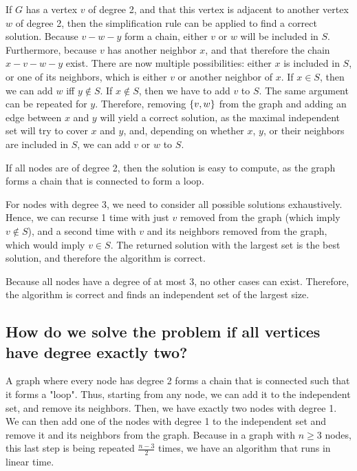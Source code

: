 \documentclass{article}
\begin{document}
If $G$ has a vertex $v$ of degree 2, and that this vertex is adjacent to another vertex $w$ of degree 2, then the simplification rule can be applied to find a correct solution. Because $v - w - y$ form a chain, either $v$ or $w$ will be included in $S$. Furthermore, because $v$ has another neighbor $x$, and that therefore the chain $x - v - w - y$ exist. There are now multiple possibilities: either $x$ is included in $S$, or one of its neighbors, which is either $v$ or another neighbor of $x$. If $x\in S$, then we can add $w$ iff $y\notin S$. If $x\notin S$, then we have to add $v$ to $S$. The same argument can be repeated for $y$. Therefore, removing $\left\{ v, w \right\}$ from the graph and adding an edge between $x$ and $y$ will yield a correct solution, as the maximal independent set will try to cover $x$ and $y$, and, depending on whether $x$, $y$, or their neighbors are included in $S$, we can add $v$ or $w$ to $S$.







If all nodes are of degree 2, then the solution is easy to compute, as the graph forms a chain that is connected to form a loop.

For nodes with degree 3, we need to consider all possible solutions exhaustively. Hence, we can recurse 1 time with just $v$ removed from the graph (which imply $v\notin S$), and a second time with $v$ and its neighbors removed from the graph, which would imply $v\in S$. The returned solution with the largest set is the best solution, and therefore the algorithm is correct.

Because all nodes have a degree of at most 3, no other cases can exist. Therefore, the algorithm is correct and finds an independent set of the largest size.

\subsection{\textbf{How do we solve the problem if all vertices have degree exactly two?}}

A graph where every node has degree 2 forms a chain that is connected such that it forms a "loop". 
Thus, starting from any node, we can add it to the independent set, and remove its neighbors. Then, we have exactly two nodes with degree 1. We can then add one of the nodes with degree 1 to the independent set and remove it and its neighbors from the graph. Because in a graph with $n\geq 3$ nodes, this last step is being repeated $\frac{n-3}{2}$ times, we have an algorithm that runs in linear time.
\end{document}
